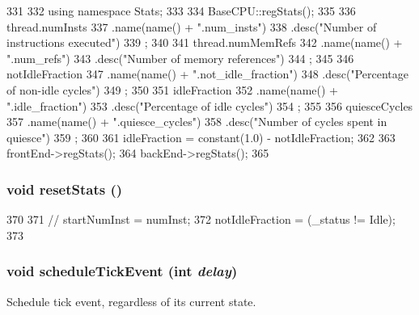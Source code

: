 \begin{DoxyCode}
331 {
332     using namespace Stats;
333 
334     BaseCPU::regStats();
335 
336     thread.numInsts
337         .name(name() + ".num_insts")
338         .desc("Number of instructions executed")
339         ;
340 
341     thread.numMemRefs
342         .name(name() + ".num_refs")
343         .desc("Number of memory references")
344         ;
345 
346     notIdleFraction
347         .name(name() + ".not_idle_fraction")
348         .desc("Percentage of non-idle cycles")
349         ;
350 
351     idleFraction
352         .name(name() + ".idle_fraction")
353         .desc("Percentage of idle cycles")
354         ;
355 
356     quiesceCycles
357         .name(name() + ".quiesce_cycles")
358         .desc("Number of cycles spent in quiesce")
359         ;
360 
361     idleFraction = constant(1.0) - notIdleFraction;
362 
363     frontEnd->regStats();
364     backEnd->regStats();
365 }
\end{DoxyCode}
\hypertarget{classOzoneCPU_a65880e61108132689a1bd769b9187fb7}{
\subsubsection[{resetStats}]{\setlength{\rightskip}{0pt plus 5cm}void resetStats ()}}
\label{classOzoneCPU_a65880e61108132689a1bd769b9187fb7}



\begin{DoxyCode}
370 {
371 //    startNumInst = numInst;
372     notIdleFraction = (_status != Idle);
373 }
\end{DoxyCode}
\hypertarget{classOzoneCPU_a5bc22ffa39321290ee497bef49ba9523}{
\subsubsection[{scheduleTickEvent}]{\setlength{\rightskip}{0pt plus 5cm}void scheduleTickEvent (int {\em delay})}}
\label{classOzoneCPU_a5bc22ffa39321290ee497bef49ba9523}


Schedule tick event, regardless of its current state. 


